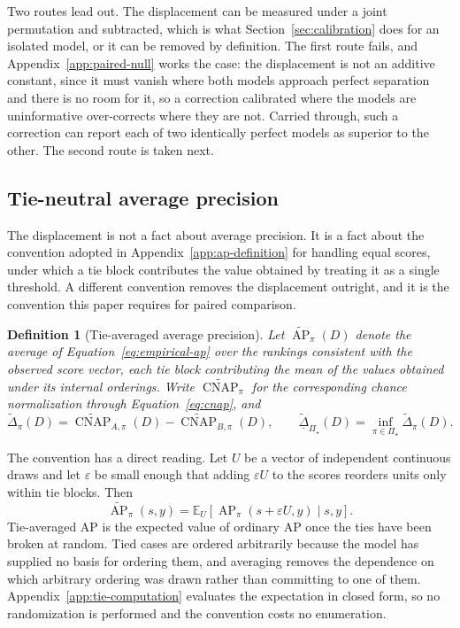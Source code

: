\documentclass[11pt]{article}
\newcommand{\AP}{\operatorname{AP}}
\newcommand{\CNAP}{\operatorname{CNAP}}
\newcommand{\PSet}{\Pi_\star}
\newcommand{\E}{\mathbb{E}}
\newcommand{\APta}{\widetilde{\AP}}
\newcommand{\CNAPta}{\widetilde{\CNAP}}
\newcommand{\Dta}{\widetilde{\Delta}}
\newcommand{\RobDta}{\underline{\widetilde{\Delta}}_{\PSet}}
\newtheorem{definition}{Definition}
\theoremstyle{remark}
\begin{document}
Two routes lead out. The displacement can be measured under a joint permutation and subtracted, which is what Section~\ref{sec:calibration} does for an isolated model, or it can be removed by definition. The first route fails, and Appendix~\ref{app:paired-null} works the case: the displacement is not an additive constant, since it must vanish where both models approach perfect separation and there is no room for it, so a correction calibrated where the models are uninformative over-corrects where they are not. Carried through, such a correction can report each of two identically perfect models as superior to the other. The second route is taken next.

\subsection{Tie-neutral average precision}
\label{sec:paired-convention}

The displacement is not a fact about average precision. It is a fact about the convention adopted in Appendix~\ref{app:ap-definition} for handling equal scores, under which a tie block contributes the value obtained by treating it as a single threshold. A different convention removes the displacement outright, and it is the convention this paper requires for paired comparison.

\begin{definition}[Tie-averaged average precision]
Let $\APta_\pi(D)$ denote the average of Equation~\eqref{eq:empirical-ap} over the rankings consistent with the observed score vector, each tie block contributing the mean of the values obtained under its internal orderings. Write $\CNAPta_\pi$ for the corresponding chance normalization through Equation~\eqref{eq:cnap}, and
\[
\Dta_\pi(D)
=
\CNAPta_{A,\pi}(D)-\CNAPta_{B,\pi}(D),
\qquad
\RobDta(D)
=
\inf_{\pi\in\PSet}\Dta_\pi(D).
\]
\end{definition}

The convention has a direct reading. Let $U$ be a vector of independent continuous draws and let $\varepsilon$ be small enough that adding $\varepsilon U$ to the scores reorders units only within tie blocks. Then
\begin{equation}
\APta_\pi(s,y)
=
\E_U\left[\AP_\pi(s+\varepsilon U,y)\mid s,y\right].
\label{eq:jitter}
\end{equation}
Tie-averaged AP is the expected value of ordinary AP once the ties have been broken at random. Tied cases are ordered arbitrarily because the model has supplied no basis for ordering them, and averaging removes the dependence on which arbitrary ordering was drawn rather than committing to one of them. Appendix~\ref{app:tie-computation} evaluates the expectation in closed form, so no randomization is performed and the convention costs no enumeration.
\end{document}
